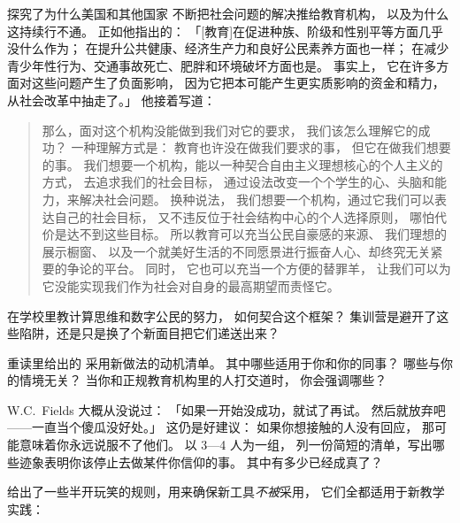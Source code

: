 
\cite{Laba2008}探究了为什么美国和其他国家
不断把社会问题的解决推给教育机构，
以及为什么这持续行不通。
正如他指出的：
「[教育]在促进种族、阶级和性别平等方面几乎没什么作为；
在提升公共健康、经济生产力和良好公民素养方面也一样；
在减少青少年性行为、交通事故死亡、肥胖和环境破坏方面也是。
事实上，
它在许多方面对这些问题产生了负面影响，
因为它把本可能产生更实质影响的资金和精力，从社会改革中抽走了。」
他接着写道：

\begin{quote}

  那么，面对这个机构没能做到我们对它的要求，
  我们该怎么理解它的成功？
  一种理解方式是：
  教育也许没在做我们要求的事，
  但它在做我们想要的事。
  我们想要一个机构，能以一种契合自由主义理想核心的个人主义的方式，
  去追求我们的社会目标，
  通过设法改变一个个学生的心、头脑和能力，来解决社会问题。
  换种说法，
  我们想要一个机构，通过它我们可以表达自己的社会目标，
  又不违反位于社会结构中心的个人选择原则，
  哪怕代价是达不到这些目标。
  所以教育可以充当公民自豪感的来源、
  我们理想的展示橱窗、
  以及一个就美好生活的不同愿景进行振奋人心、却终究无关紧要的争论的平台。
  同时，
  它也可以充当一个方便的替罪羊，
  让我们可以为它没能实现我们作为社会对自身的最高期望而责怪它。

\end{quote}

在学校里教计算思维和数字公民的努力，
如何契合这个框架？
集训营是避开了这些陷阱，还是只是换了个新面目把它们递送出来？


重读里给出的
采用新做法的动机清单。
其中哪些适用于你和你的同事？
哪些与你的情境无关？
当你和正规教育机构里的人打交道时，
你会强调哪些？


W.C.~Fields 大概从没说过：
「如果一开始没成功，就试了再试。
然后就放弃吧——一直当个傻瓜没好处。」
这仍是好建议：
如果你想接触的人没有回应，
那可能意味着你永远说服不了他们。
以 3—4 人为一组，
列一份简短的清单，写出哪些迹象表明你该停止去做某件你信仰的事。
其中有多少已经成真了？


\cite{Farm2006}给出了一些半开玩笑的规则，用来确保新工具\emph{不被}采用，
它们全都适用于新教学实践：

